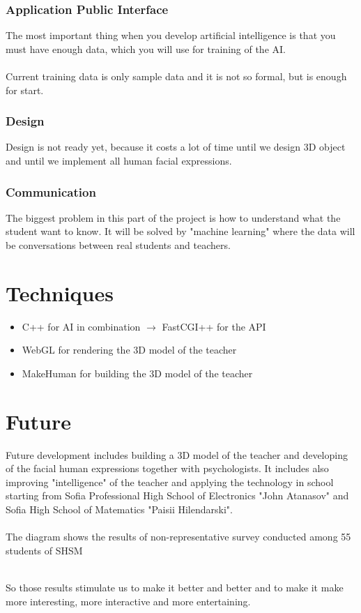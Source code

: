 \documentclass[a4paper, 12pt]{article}
\begin{document}
			\subsubsection{Application Public Interface}
				The most important thing when you develop artificial intelligence is that you must have enough data, which you will use for training of the AI. \\ \\
				Current training data is only sample data and it is not so formal, but is enough for start.
			\subsubsection{Design}
				Design is not ready yet, because it costs a lot of time until we design 3D object and until we implement all human facial expressions. 
			\subsubsection{Communication}
				The biggest problem in this part of the project is how to understand what the student want to know. It will be solved by "machine learning" where the data will be conversations between real students and teachers.
	\section{Techniques}
	\begin{itemize}
		\item C++ for AI in combination $\rightarrow$ FastCGI++ for the API
		\item WebGL for rendering the 3D model of the teacher
		\item MakeHuman for building the 3D model of the teacher
	\end{itemize}
	\section{Future}
	Future development includes building a 3D model of the teacher and developing of the facial human expressions together with psychologists. 
	It includes also improving "intelligence" of the teacher and applying the technology in school starting from Sofia Professional High School of Electronics "John Atanasov" and Sofia High School of Matematics "Paisii Hilendarski".
	\\ \\
	The diagram shows the results of non-representative survey conducted among 55 students of SHSM \\
	\begin{center}
	\end{center}
	\\
	So those results stimulate us to make it better and better and to make it make more interesting, more interactive and more entertaining.
\end{document}

